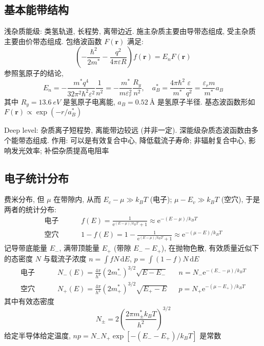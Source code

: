 \documentclass[11pt,a4paper]{article}%
\numberwithin{equation}{section}%
\renewcommand*{\vec}[1]{\bm{#1}}%
\newcommand{\dif}{\,\mathrm d}
\newcommand\e{\mathrm{e}}%
\begin{document}
\subsection{基本能带结构} %
\label{sub:semi_band}
浅杂质能级: 类氢轨道, 长程势, 离带边近. 施主杂质主要由导带态组成, 受主杂质主要由价带态组成. 包络波函数 $F(\vec r)$ 满足:
\begin{equation}
	\left(-\frac{\hbar^2}{2m^*} - \frac{q^2}{4\pi\varepsilon R}\right) f(\vec r) = E_n F(\vec r)
\end{equation}
参照氢原子的结论, 
\begin{equation}
	E_n = -\frac{m^* q^4}{32\pi^2\hbar^2\varepsilon^2}\frac 1{n^2}
	=-\frac{m^*}{m\varepsilon_r^2}\frac{R_y}{n^2}, \quad
	a_B^* = \frac{4\pi\hbar^2}{m^*}\frac{\varepsilon}{q^2} = \frac{\varepsilon_r m}{m^*} a_B
\end{equation}
其中 $R_y = \SI{13.6}{eV}$ 是氢原子电离能, $a_B = \SI{0.52}{\angstrom}$ 是氢原子半径. 基态波函数形如 $F(\vec r) \propto \exp(-r/a_B^*)$

Deep level: 杂质离子短程势, 离能带边较远 (并非一定). 深能级杂质态波函数由多个能带态组成. 作用: 可以是有效复合中心, 降低载流子寿命; 非辐射复合中心, 影响发光效率; 补偿杂质提高电阻率
\subsection{电子统计分布} %
\label{sub:stat_semi_con}
费米分布, 但 $\mu$ 在带隙内, 从而 $E_c-\mu\gg k_B T$ (电子); $\mu - E_v \gg k_B T$ (空穴), 于是两者的统计分布:
\begin{align}
	\mbox{电子 }\qquad &f(E) = \frac 1{\e^{(E-\mu)/k_BT}+1} \approx \e^{-(E-\mu)/k_B T} \\
	\mbox{空穴 }\qquad &1-f(E) = 1-\frac 1{\e^{(E-\mu)/k_BT}+1} \approx \e^{-(\mu - E)/k_B T}
\end{align}
记导带底能量 $E_-$, 满带顶能量 $E_+$ (带隙 $E_- - E_+$), 在抛物色散, 有效质量近似下的态密度 $N$ 与载流子浓度 $n = \int f N\dif E$, $p = \int (1-f)N\dif E$
\begin{align}
	\mbox{电子 }\qquad &N_-(E) = \frac{4\pi}{h^3}(2m^*_-)^{3/2}\sqrt{E - E_-} 
	&&n = N_-\e^{-(E_--\mu)/k_BT} \\
	\mbox{空穴 }\qquad &N_+(E) = \frac{4\pi}{h^3}(2m^*_+)^{3/2}\sqrt{E_+ - E} 
	&&p = N_+\e^{-(\mu-E_+)/k_BT} 
\end{align}
其中有效态密度
\begin{equation}
	N_\pm = 2\left(\frac{2\pi m^*_\pm k_BT}{h^2}\right)^{3/2}
\end{equation}
给定半导体给定温度, $np = N_-N_+\exp\left[-(E_--E_+)/k_BT\right]$ 是常数
\end{document}
